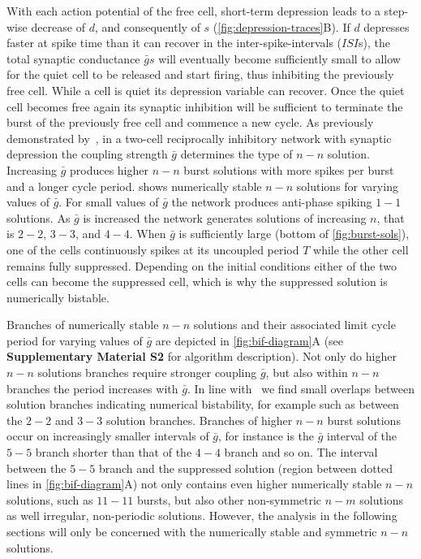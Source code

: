 \documentclass[utf8,draft]{frontiersFPHY} %
\newcommand{\gbar}{\bar g}
\begin{document}
With each action potential of the free cell, short-term depression leads to a step-wise decrease of $d$, and consequently of $s$ (\cref{fig:depression-traces}B).
If $d$ depresses faster at spike time than it can recover in the inter-spike-intervals ($ISI$s), the total synaptic conductance $\gbar s$ will eventually become sufficiently small to allow for the quiet cell to be released and start firing, thus inhibiting the previously free cell.
While a cell is quiet its depression variable can recover.
Once the quiet cell becomes free again its synaptic inhibition will be sufficient to terminate the burst of the previously free cell and commence a new cycle.
As previously demonstrated by~\citet{bose2011}, in a two-cell reciprocally inhibitory network with synaptic depression the coupling strength $\gbar$ determines the type of $n-n$ solution.
Increasing $\gbar$ produces higher $n-n$ burst solutions with more spikes per burst and a longer cycle period.
 shows numerically stable $n-n$ solutions for varying values of $\gbar$.
For small values of $\gbar$ the network produces anti-phase spiking $1-1$ solutions.
As $\gbar$ is increased the network generates solutions of increasing $n$, that is $2-2$, $3-3$, and $4-4$.
When $\gbar$ is sufficiently large (bottom of \cref{fig:burst-sols}), one of the cells continuously spikes at its uncoupled period $T$ while the other cell remains fully suppressed.
Depending on the initial conditions either of the two cells can become the suppressed cell, which is why the suppressed solution is numerically bistable.

Branches of numerically stable $n-n$ solutions and their associated limit cycle period for varying values of $\gbar$ are depicted in \cref{fig:bif-diagram}A (see  \textbf{Supplementary Material S2} for algorithm description).
Not only do higher $n-n$ solutions branches require stronger coupling $\gbar$, but also within $n-n$ branches the period increases with $\gbar$.
In line with~\citet{bose2011} we find small overlaps between solution branches indicating numerical bistability, for example such as between the $2-2$ and $3-3$ solution branches.
Branches of higher $n-n$ burst solutions occur on increasingly smaller intervals of $\gbar$, for instance is the $\gbar$ interval of the $5-5$ branch shorter than that of the $4-4$ branch and so on.
The interval between the $5-5$ branch and the suppressed solution (region between dotted lines in \cref{fig:bif-diagram}A) not only contains even higher numerically stable $n-n$ solutions, such as $11-11$ bursts, but also other non-symmetric $n-m$ solutions as well irregular, non-periodic solutions. However, the analysis in the following sections will only be concerned with the numerically stable and symmetric $n-n$ solutions.
\end{document}
